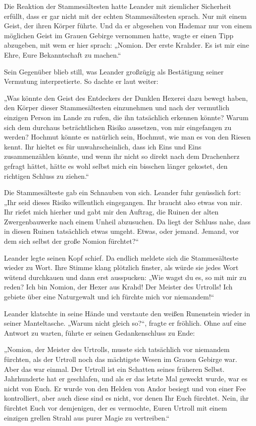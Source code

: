 Die Reaktion der Stammesältesten hatte Leander mit ziemlicher Sicherheit erfüllt, dass er gar nicht mit der echten Stammesältesten sprach. Nur mit einem Geist, der ihren Körper führte. Und da er abgesehen von Hademar nur von einem möglichen Geist im Grauen Gebirge vernommen hatte, wagte er einen Tipp abzugeben, mit wem er hier sprach: „Nomion. Der erste Krahder. Es ist mir eine Ehre, Eure Bekanntschaft zu machen.“

Sein Gegenüber blieb still, was Leander großzügig als Bestätigung seiner Vermutung interpretierte. So dachte er laut weiter:

„Was könnte den Geist des Entdeckers der Dunklen Hexerei dazu bewegt haben, den Körper dieser Stammesältesten einzunehmen und nach der vermutlich einzigen Person im Lande zu rufen, die ihn tatsächlich erkennen könnte? Warum sich dem durchaus beträchtlichen Risiko aussetzen, von mir eingefangen zu werden? Hochmut könnte es natürlich sein, Hochmut, wie man es von den Riesen kennt. Ihr hieltet es für unwahrscheinlich, dass ich Eins und Eins zusammenzählen könnte, und wenn ihr nicht so direkt nach dem Drachenherz gefragt hättet, hätte es wohl selbst mich ein bisschen länger gekostet, den richtigen Schluss zu ziehen.“

Die Stammesälteste gab ein Schnauben von sich. Leander fuhr genüsslich fort: „Ihr seid dieses Risiko willentlich eingegangen. Ihr braucht also etwas von mir. Ihr riefet mich hierher und gabt mir den Auftrag, die Ruinen der alten Zwergenbauwerke nach einem Unheil abzusuchen. Da liegt der Schluss nahe, dass in diesen Ruinen tatsächlich etwas umgeht. Etwas, oder jemand. Jemand, vor dem sich selbst der große Nomion fürchtet?“

Leander legte seinen Kopf schief. Da endlich meldete sich die Stammesälteste wieder zu Wort. Ihre Stimme klang plötzlich finster, als würde sie jedes Wort wütend durchkauen und dann erst ausspucken: „Wie wagst du es, so mit mir zu reden? Ich bin Nomion, der Hexer aus Krahd! Der Meister des Urtrolls! Ich gebiete über eine Naturgewalt und ich fürchte mich vor niemandem!“

Leander klatschte in seine Hände und verstaute den weißen Runenstein wieder in seiner Manteltasche. „Warum nicht gleich so?“, fragte er fröhlich. Ohne auf eine Antwort zu warten, führte er seinen Gedankenschluss zu Ende:

„Nomion, der Meister des Urtrolls, musste sich tatsächlich vor niemandem fürchten, als der Urtroll noch das mächtigste Wesen im Grauen Gebirge war. Aber das war einmal. Der Urtroll ist ein Schatten seines früheren Selbst. Jahrhunderte hat er geschlafen, und als er das letzte Mal geweckt wurde, war es nicht von Euch. Er wurde von den Helden von Andor besiegt und von einer Fee kontrolliert, aber auch diese sind es nicht, vor denen Ihr Euch fürchtet. Nein, ihr fürchtet Euch vor demjenigen, der es vermochte, Euren Urtroll mit einem einzigen grellen Strahl aus purer Magie zu vertreiben.“

